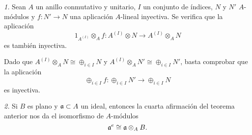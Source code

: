 \documentclass[../main.tex]{subfiles}
\begin{document}
\begin{remark}\textit{1.} Sean $A$ un anillo conmutativo y unitario, $I$ un conjunto de índices, $N$ y $N'$ $A$-módulos y $f:N'\longrightarrow N$ una aplicación $A$-lineal inyectiva. Se verifica que la aplicación $$1_{A^{(I)}}\otimes_A f:A^{(I)}\otimes N\longrightarrow A^{(I)}\otimes_A N$$ es también inyectiva.
	
	Dado que $A^{(I)}\otimes_A N\cong\oplus_{i\in I}N$ y $A^{(I)}\otimes_A N'\cong\oplus_{i\in I}N'$, basta comprobar que la aplicación $$\oplus_{i\in I}f:\oplus_{i\in I}N'\longrightarrow \oplus_{i\in I}N$$ es inyectiva.
	
	\textit{2.} Si $B$ es plano y $\mathfrak{a}\subset A$ un ideal, entonces la cuarta afirmación del teorema anterior nos da el isomorfismo de $A$-módulos $$\mathfrak{a}^e\cong \mathfrak{a}\otimes_A B.$$
\end{remark}
\end{document}

